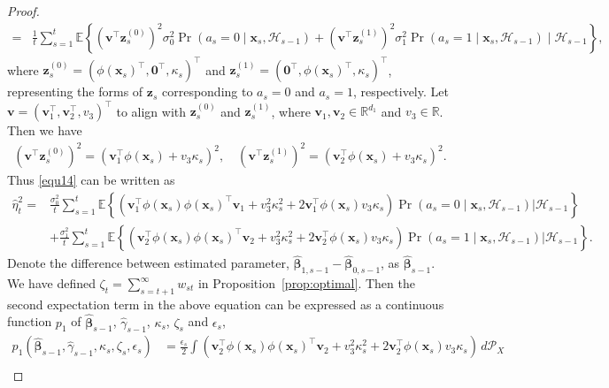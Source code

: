 \documentclass[12pt]{article}
\begin{document}
\begin{proof}
\begin{align}
     = &\frac{1}{t} \sum_{s=1}^t \mathbb{E} \left\{\left( \bm{v}^{\top} \bm{z}_s^{(0)} \right)^2 \sigma_{0}^2 \Pr(a_s=0\mid \bm{x}_s,\mathcal{H}_{s-1}) + \left( \bm{v}^{\top} \bm{z}_s^{(1)} \right)^2 \sigma_{1}^2 \Pr(a_s=1\mid \bm{x}_s,\mathcal{H}_{s-1}) \mid \mathcal{H}_{s-1}\right\}, \label{equ14}
\end{align}
where $\bm{z}_s^{(0)} = (\phi(\bm{x}_s)^{\top}, \bm{0}^{\top}, \kappa_s)^{\top}$ and $\bm{z}_s^{(1)} = (\bm{0}^{\top}, \phi(\bm{x}_s)^{\top}, \kappa_s)^{\top}$, representing the forms of $\bm{z}_s$ corresponding to $a_s = 0$ and $a_s = 1$, respectively.
Let $\bm{v} = (\bm{v}^{\top}_1,\bm{v}^{\top}_2,v_3)^{\top}$ to align with $\bm{z}_s^{(0)}$ and $\bm{z}_s^{(1)}$, where $\bm{v}_1,\bm{v}_2 \in \mathbb{R}^{d_1}$ and $v_3 \in \mathbb{R}$. Then we have 
\begin{align*}
   \left( \bm{v}^{\top} \bm{z}_s^{(0)} \right)^2 = \left(\bm{v}_1^{\top} \phi(\bm{x}_s) + v_3\kappa_s \right)^2,  \quad  \left( \bm{v}^{\top} \bm{z}_s^{(1)} \right)^2 = \left(\bm{v}_2^{\top} \phi(\bm{x}_s) + v_3\kappa_s \right)^2.
\end{align*}
Thus \eqref{equ14} can be written as
\begin{align*}
    \widehat{\eta}_t^2 =& \frac{\sigma_0^2 }{t} \sum_{s=1}^t \mathbb{E}\left\{\left(\bm{v}_1^{\top} \phi(\bm{x}_s) \phi(\bm{x}_s)^{\top} \bm{v}_1 + v_3^2\kappa_s^2+2\bm{v}_1^{\top}\phi(\bm{x}_s) v_3\kappa_s\right) \Pr(a_s=0\mid \bm{x}_s,\mathcal{H}_{s-1})\Big| \mathcal{H}_{s-1}\right\} \\
    &+ \frac{\sigma_1^2 }{t} \sum_{s=1}^t \mathbb{E}\left\{\left(\bm{v}_2^{\top} \phi(\bm{x}_s) \phi(\bm{x}_s)^{\top} \bm{v}_2 + v_3^2\kappa_s^2+2\bm{v}_2^{\top}\phi(\bm{x}_s) v_3\kappa_s\right) \Pr(a_s=1\mid \bm{x}_s,\mathcal{H}_{s-1}) \Big| \mathcal{H}_{s-1}\right\}.
\end{align*}
Denote the difference between estimated parameter, $\widehat{\bm{\beta}}_{1,s-1} - \widehat{\bm{\beta}}_{0,s-1}$, as $\widehat{\bm{\beta}}_{s-1}$. We have defined $\zeta_t = \sum_{s=t+1}^\infty w_{st}$ in Proposition~\ref{prop:optimal}. Then the second expectation term in the above equation can be expressed as a continuous function $p_1$ of $\widehat{\bm{\beta}}_{s-1}$, $\widehat{\gamma}_{s-1}$, $\kappa_s$, $\zeta_s$ and $\epsilon_s$,
\begin{align*}
    p_1(\widehat{\bm{\beta}}_{s-1},\widehat{\gamma}_{s-1},\kappa_s,\zeta_s,\epsilon_s) &= \frac{\epsilon_s}{2}\int (\bm{v}_2^{\top} \phi(\bm{x}_s) \phi(\bm{x}_s)^{\top} \bm{v}_2 + v_3^2\kappa_s^2+2\bm{v}_2^{\top}\phi(\bm{x}_s) v_3\kappa_s) \, d\mathcal{P}_X \\

\end{align*}
\end{proof}
\end{document}
